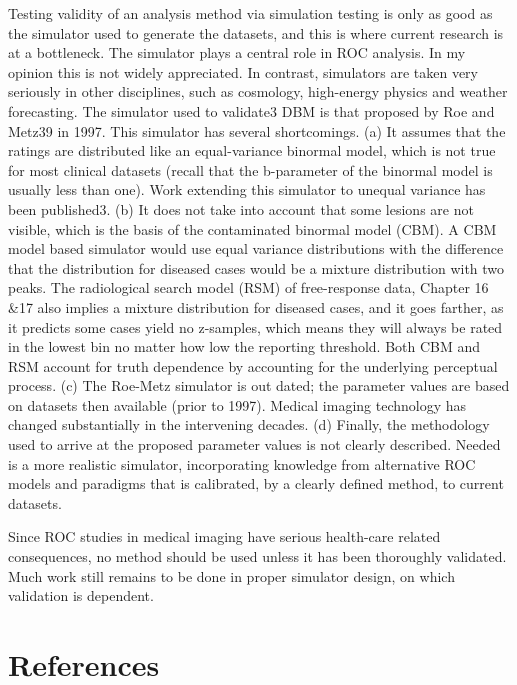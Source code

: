\documentclass[
]{book}
\begin{document}
Testing validity of an analysis method via simulation testing is only as good as the simulator used to generate the datasets, and this is where current research is at a bottleneck. The simulator plays a central role in ROC analysis. In my opinion this is not widely appreciated. In contrast, simulators are taken very seriously in other disciplines, such as cosmology, high-energy physics and weather forecasting. The simulator used to validate3 DBM is that proposed by Roe and Metz39 in 1997. This simulator has several shortcomings. (a) It assumes that the ratings are distributed like an equal-variance binormal model, which is not true for most clinical datasets (recall that the b-parameter of the binormal model is usually less than one). Work extending this simulator to unequal variance has been published3. (b) It does not take into account that some lesions are not visible, which is the basis of the contaminated binormal model (CBM). A CBM model based simulator would use equal variance distributions with the difference that the distribution for diseased cases would be a mixture distribution with two peaks. The radiological search model (RSM) of free-response data, Chapter 16 \&17 also implies a mixture distribution for diseased cases, and it goes farther, as it predicts some cases yield no z-samples, which means they will always be rated in the lowest bin no matter how low the reporting threshold. Both CBM and RSM account for truth dependence by accounting for the underlying perceptual process. (c) The Roe-Metz simulator is out dated; the parameter values are based on datasets then available (prior to 1997). Medical imaging technology has changed substantially in the intervening decades. (d) Finally, the methodology used to arrive at the proposed parameter values is not clearly described. Needed is a more realistic simulator, incorporating knowledge from alternative ROC models and paradigms that is calibrated, by a clearly defined method, to current datasets.

Since ROC studies in medical imaging have serious health-care related consequences, no method should be used unless it has been thoroughly validated. Much work still remains to be done in proper simulator design, on which validation is dependent.

\hypertarget{dbm-analysis-background-references}{%
\section{References}\label{dbm-analysis-background-references}}
\end{document}
